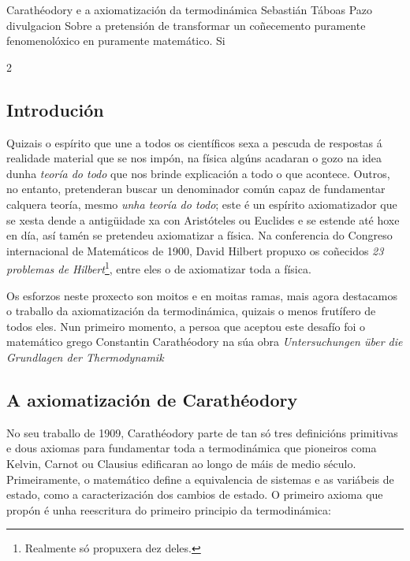 \titular%
{Carathéodory e a axiomatización da termodinámica}
{Sebastián Táboas Pazo}
{divulgacion}
{Sobre a pretensión de transformar un coñecemento puramente fenomenolóxico en puramente matemático.}
{Si}


\begin{refsection}
\begin{multicols}{2}

\subsection*{Introdución}

Quizais o espírito que une a todos os científicos sexa a pescuda de respostas á
realidade material que se nos impón, na física algúns acadaran o gozo na idea
dunha \textit{teoría do todo} que nos brinde explicación a todo o que acontece.
Outros, no entanto, pretenderan buscar un denominador común capaz de
fundamentar calquera teoría, mesmo \textit{unha teoría do todo}; este é un
espírito axiomatizador que se xesta dende a antigüidade xa con Aristóteles ou
Euclides e se estende até hoxe en día, así tamén se pretendeu axiomatizar a
física. Na conferencia do Congreso internacional de Matemáticos de 1900, David
Hilbert propuxo os coñecidos \textit{23 problemas de
Hilbert}\footnote{Realmente só propuxera dez deles.}, entre eles o de
axiomatizar toda a física.

Os esforzos neste proxecto son moitos e en moitas ramas, mais agora destacamos
o traballo da axiomatización da termodinámica, quizais o menos frutífero de
todos eles. Nun primeiro momento, a persoa que aceptou este desafío foi o
matemático grego Constantin Carathéodory na súa obra \textit{Untersuchungen
über die Grundlagen der Thermodynamik}

\subsection*{A axiomatización de Carathéodory}

No seu traballo de 1909, Carathéodory parte de tan só tres definicións
primitivas e dous axiomas para fundamentar toda a termodinámica que pioneiros
coma Kelvin, Carnot ou Clausius edificaran ao longo de máis de medio século.
Primeiramente, o matemático define a equivalencia de sistemas e as variábeis de
estado, como a caracterización dos cambios de estado. O primeiro axioma que
propón é unha reescritura do primeiro principio da termodinámica:


\end{multicols}
\end{refsection}
